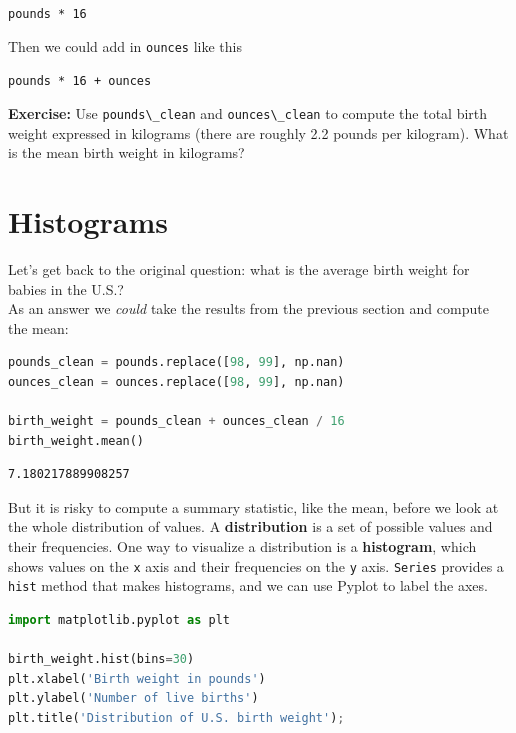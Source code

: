 \passthrough{\lstinline!pounds * 16!}

Then we could add in \passthrough{\lstinline!ounces!} like this

\passthrough{\lstinline!pounds * 16 + ounces!}

\textbf{Exercise:} Use \passthrough{\lstinline!pounds\_clean!} and
\passthrough{\lstinline!ounces\_clean!} to compute the total birth
weight expressed in kilograms (there are roughly 2.2 pounds per
kilogram). What is the mean birth weight in kilograms?

\hypertarget{histograms}{%
\section{Histograms}\label{histograms}}

Let's get back to the original question: what is the average birth
weight for babies in the U.S.?\\
As an answer we \emph{could} take the results from the previous section
and compute the mean:

\begin{lstlisting}[language=Python,style=source]
pounds_clean = pounds.replace([98, 99], np.nan)
ounces_clean = ounces.replace([98, 99], np.nan)

birth_weight = pounds_clean + ounces_clean / 16
birth_weight.mean()
\end{lstlisting}

\begin{lstlisting}[style=output]
7.180217889908257
\end{lstlisting}

But it is risky to compute a summary statistic, like the mean, before we
look at the whole distribution of values. A \textbf{distribution} is a
set of possible values and their frequencies. One way to visualize a
distribution is a \textbf{histogram}, which shows values on the
\passthrough{\lstinline!x!} axis and their frequencies on the
\passthrough{\lstinline!y!} axis. \passthrough{\lstinline!Series!}
provides a \passthrough{\lstinline!hist!} method that makes histograms,
and we can use Pyplot to label the axes.

\begin{lstlisting}[language=Python,style=source]
import matplotlib.pyplot as plt

birth_weight.hist(bins=30)
plt.xlabel('Birth weight in pounds')
plt.ylabel('Number of live births')
plt.title('Distribution of U.S. birth weight');
\end{lstlisting}

